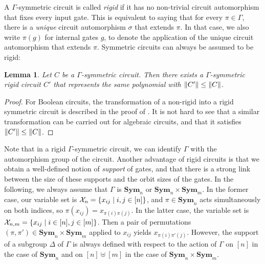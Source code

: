 \documentclass[10pt,a4paper]{article}
\theoremstyle{definition}
\theoremstyle{plain}
\newtheorem{lemma}[definition]{Lemma}
\theoremstyle{remark}
\DeclarePairedDelimiter{\norm}{\lVert}{\rVert}
\newcommand{\Xx}{{\cal X}}
\newcommand{\Sym}{\mathbf{Sym}}
\begin{document}
A $\Gamma$-symmetric circuit is called \emph{rigid} if it has no non-trivial circuit automorphism that fixes every input gate. This is equivalent to saying that for every $\pi \in \Gamma$, there is a \emph{unique} circuit automorphism $\sigma$ that extends $\pi$. In that case, we also write $\pi(g)$ for internal gates $g$, to denote the application of the unique circuit automorphism that extends $\pi$. Symmetric circuits can always be assumed to be rigid:

\begin{lemma}
	\label{lem:rigidifyCircuits}
	Let $C$ be a $\Gamma$-symmetric circuit.
	Then there exists a $\Gamma$-symmetric \emph{rigid} circuit
	$C'$ that represents the same polynomial with $\norm{C'} \leq
	\norm{C}$.
\end{lemma}	
\begin{proof}
	For Boolean circuits, the transformation of a non-rigid into a rigid symmetric circuit is described in the proof of \cite[Lemma 7]{anderson_symmetric_2017}. 
	It is not hard to see that a similar transformation can be carried out for algebraic circuits, and that it satisfies $\norm{C'} \leq \norm{C}$.
\end{proof}	
Note that in a rigid $\Gamma$-symmetric circuit, we can identify $\Gamma$ with the automorphism group of the circuit. 
Another advantage of rigid circuits is
that we obtain a well-defined notion of \emph{support} of gates, and
that there is a strong link between the size of these supports and the
orbit sizes of the gates.  
In the following, we always assume that $\Gamma$ is $\Sym_n$ or $\Sym_n \times \Sym_m$.
In the former case, our variable set is $\Xx_n = \{ x_{ij} \mid i,j \in [n] \}$, and $\pi \in \Sym_n$ acts simultaneously on both indices, so $\pi(x_{ij}) = x_{\pi(i)\pi(j)}$.
In the latter case, the variable set is $\Xx_{n,m} = \{x_{ij} \mid i
\in [n], j \in [m]\}$. Then a pair of permutations $(\pi, \pi') \in
\Sym_n \times \Sym_m$ applied to $x_{ij}$ yields $x_{\pi(i)\pi'(j)}$.
However, the support of a subgroup $\Delta$ of $\Gamma$ is always defined
with respect to the action of $\Gamma$ on $[n]$ in the case of
$\Sym_n$ and on $[n]\uplus [m]$ in the case of $\Sym_n \times \Sym_m$.
\end{document}
